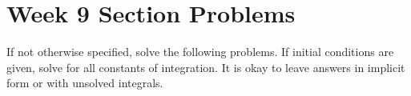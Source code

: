 \documentclass[letterpaper, fontsize=11pt]{scrartcl} %
\numberwithin{equation}{section} %
\numberwithin{figure}{section} %
\numberwithin{table}{section} %
\begin{document}

\newcommand{\horrule}[1]{\rule{\linewidth}{#1}} %


\section*{Week 9 Section Problems}
\par If not otherwise specified, solve the following problems. If initial conditions are given, solve for all constants of integration. It is okay to leave answers in implicit form or with unsolved integrals. 
\end{document}
